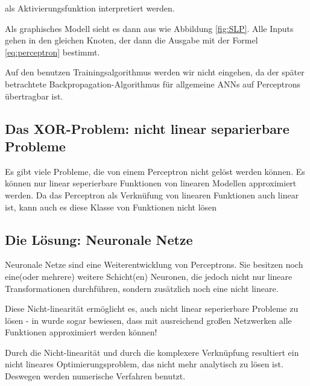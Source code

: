 als Aktivierungsfunktion interpretiert werden.

Als graphisches Modell sieht es dann aus wie Abbildung \ref{fig:SLP}. Alle Inputs gehen in den gleichen Knoten, der dann die Ausgabe mit der Formel \ref{eq:perceptron} bestimmt. 

Auf den benutzen Trainingsalgorithmus werden wir nicht eingehen, da der später betrachtete Backpropagation-Algorithmus für allgemeine ANNs auf Perceptrons übertragbar ist.

\subsection{Das XOR-Problem: nicht linear separierbare Probleme}
Es gibt viele Probleme, die von einem Perceptron nicht gelöst werden können. Es können nur linear seperierbare Funktionen von linearen Modellen approximiert werden. Da das Perceptron als Verknüfung von linearen Funktionen auch linear ist, kann auch es diese Klasse von Funktionen nicht lösen

\subsection{Die Lösung: Neuronale Netze}
Neuronale Netze sind eine Weiterentwicklung von Perceptrons. Sie besitzen noch eine(oder mehrere) weitere Schicht(en) Neuronen, die jedoch nicht nur lineare Transformationen durchführen, sondern zusätzlich noch eine nicht lineare.

Diese Nicht-linearität ermöglicht es, auch nicht linear seperierbare Probleme zu lösen - in \cite{cybenko1989approximation} wurde sogar bewiesen, dass mit ausreichend großen Netzwerken alle Funktionen approximiert werden können!

Durch die Nicht-linearität und durch die komplexere Verknüpfung resultiert ein nicht lineares Optimierungsproblem, das nicht mehr analytisch zu lösen ist. Deswegen werden numerische Verfahren benutzt.


